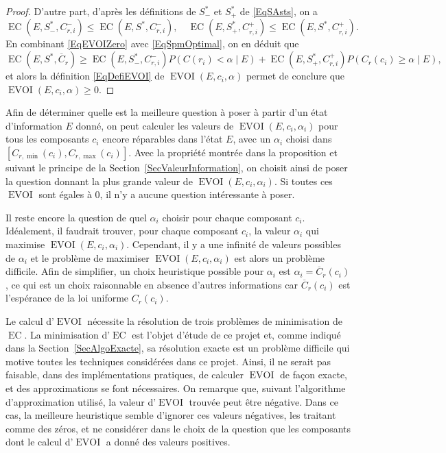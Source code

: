 \documentclass[a4paper,11pt]{article}
\theoremstyle{plain}
\theoremstyle{definition}
\DeclareMathOperator{\EC}{EC}
\DeclareMathOperator{\EVOI}{EVOI}
\begin{document}
\begin{proof}
D'autre part, d'après les définitions de $S_-^\ast$ et $S_+^\ast$ de \eqref{EqSAsts}, on a
\begin{equation}
\label{EqSpmOptimal}
\EC(E, S_-^\ast, C_{r, i}^-) \leq \EC(E, S^\ast, C_{r, i}^-), \quad \EC(E, S_+^\ast, C_{r, i}^+) \leq \EC(E, S^\ast, C_{r, i}^+).
\end{equation}
En combinant \eqref{EqEVOIZero} avec \eqref{EqSpmOptimal}, on en déduit que
\[
\EC(E, S^\ast, \overline C_r) \geq \EC(E, S_-^\ast, C_{r, i}^-) P(C(r_i) < \alpha \mid E) + \EC(E, S_+^\ast, C_{r, i}^+) P(C_r(c_i) \geq \alpha \mid E),
\]
et alors la définition \eqref{EqDefiEVOI} de $\EVOI(E, c_i, \alpha)$ permet de conclure que $\EVOI(E, c_i, \alpha) \geq 0$.
\end{proof}

Afin de déterminer quelle est la meilleure question à poser à partir d'un état d'information $E$ donné, on peut calculer les valeurs de $\EVOI(E, c_i, \alpha_i)$ pour tous les composants $c_i$ encore réparables dans l'état $E$, avec un $\alpha_i$ choisi dans $[C_{r, \min}(c_i), C_{r, \max}(c_i)]$. Avec la propriété montrée dans la proposition et suivant le principe de la Section~\ref{SecValeurInformation}, on choisit ainsi de poser la question donnant la plus grande valeur de $\EVOI(E, c_i, \alpha_i)$. Si toutes ces $\EVOI$ sont égales à $0$, il n'y a aucune question intéressante à poser.

Il reste encore la question de quel $\alpha_i$ choisir pour chaque composant $c_i$. Idéalement, il faudrait trouver, pour chaque composant $c_i$, la valeur $\alpha_i$ qui maximise $\EVOI(E, c_i, \alpha_i)$. Cependant, il y a une infinité de valeurs possibles de $\alpha_i$ et le problème de maximiser $\EVOI(E, c_i, \alpha_i)$ est alors un problème difficile. Afin de simplifier, un choix heuristique possible pour $\alpha_i$ est $\alpha_i = \overline C_r(c_i)$, ce qui est un choix raisonnable en absence d'autres informations car $\overline C_r(c_i)$ est l'espérance de la loi uniforme $C_r(c_i)$.

Le calcul d'$\EVOI$ nécessite la résolution de trois problèmes de minimisation de $\EC$. La minimisation d'$\EC$ est l'objet d'étude de ce projet et, comme indiqué dans la Section~\ref{SecAlgoExacte}, sa résolution exacte est un problème difficile qui motive toutes les techniques considérées dans ce projet. Ainsi, il ne serait pas faisable, dans des implémentations pratiques, de calculer $\EVOI$ de façon exacte, et des approximations se font nécessaires. On remarque que, suivant l'algorithme d'approximation utilisé, la valeur d'$\EVOI$ trouvée peut être négative. Dans ce cas, la meilleure heuristique semble d'ignorer ces valeurs négatives, les traitant comme des zéros, et ne considérer dans le choix de la question que les composants dont le calcul d'$\EVOI$ a donné des valeurs positives.
\end{document}

